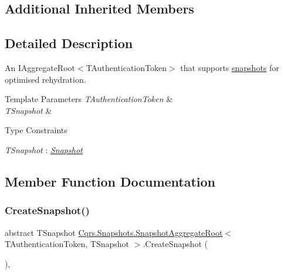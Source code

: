 \subsection*{Additional Inherited Members}


\subsection{Detailed Description}
An I\+Aggregate\+Root$<$\+T\+Authentication\+Token$>$ that supports \hyperlink{classCqrs_1_1Snapshots_1_1Snapshot}{snapshots} for optimised rehydration. 


\begin{DoxyTemplParams}{Template Parameters}
{\em T\+Authentication\+Token} & \\
\hline
{\em T\+Snapshot} & \\
\hline
\end{DoxyTemplParams}
\begin{Desc}
\item[Type Constraints]\begin{description}
\item[{\em T\+Snapshot} : {\em \hyperlink{classCqrs_1_1Snapshots_1_1Snapshot}{Snapshot}}]\end{description}
\end{Desc}


\subsection{Member Function Documentation}
\mbox{\label{classCqrs_1_1Snapshots_1_1SnapshotAggregateRoot_a2d8cd57c7b6c2696d286c6dc5e9f0479_a2d8cd57c7b6c2696d286c6dc5e9f0479}} 
\subsubsection{\texorpdfstring{Create\+Snapshot()}{CreateSnapshot()}}
{\footnotesize\ttfamily abstract T\+Snapshot \hyperlink{classCqrs_1_1Snapshots_1_1SnapshotAggregateRoot}{Cqrs.\+Snapshots.\+Snapshot\+Aggregate\+Root}$<$ T\+Authentication\+Token, T\+Snapshot $>$.Create\+Snapshot (\begin{DoxyParamCaption}{ }\end{DoxyParamCaption})\hspace{0.3cm}{\ttfamily [protected]}, {}}




